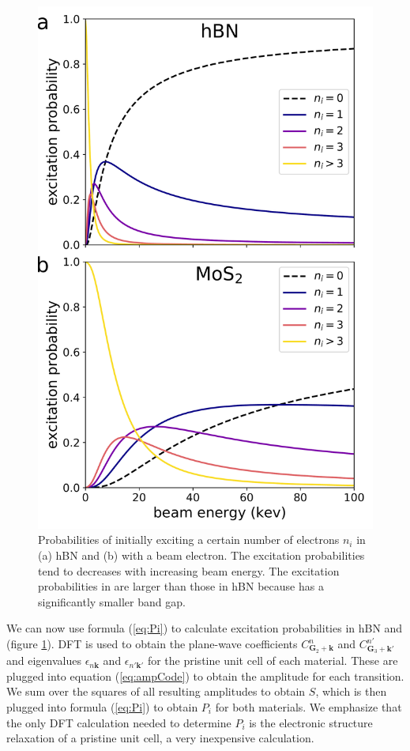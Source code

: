 \documentclass[twoside,twocolumn,9pt]{article}
\begin{document}
\begin{figure}
  \centering
  \includegraphics[width=.45\textwidth]{figures/exciProbs_portrait.pdf}
  \caption{
    Probabilities of initially exciting a certain number of electrons $n_i$ in
    (a) hBN and (b)  with a beam electron.
    The excitation probabilities tend to decreases with increasing beam energy.
    The excitation probabilities in  are larger than those in hBN
    because  has a significantly smaller band gap.
  } 
  \label{fig:Pi}
\end{figure}

We can now use formula (\ref{eq:Pi}) to calculate excitation probabilities in
hBN and  (figure \ref{fig:Pi}).
DFT is used to obtain the plane-wave coefficients $C_{\mathbf{G}_2
+\mathbf{k}}^n$ and $C_{\mathbf{G}_3+\mathbf{k'}}^{n'}$ and eigenvalues
$\epsilon_{n\mathbf{k}}$ and $\epsilon_{n'\mathbf{k'}}$ for the pristine unit
cell of each material.
These are plugged into equation (\ref{eq:ampCode}) to obtain the amplitude for
each transition.
We sum over the squares of all resulting amplitudes to obtain $S$, which is
then plugged into formula (\ref{eq:Pi}) to obtain $P_i$ for both materials.
We emphasize that the only DFT calculation needed to determine $P_i$ is the
electronic structure relaxation of a pristine unit cell, a very inexpensive
calculation.
\end{document}
